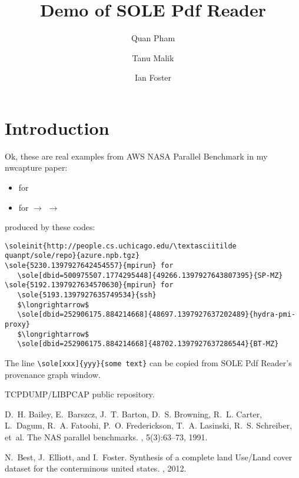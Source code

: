 \documentclass{article}
\title{Demo of SOLE Pdf Reader}
\author{Quan Pham \and Tanu Malik \and Ian Foster}
\begin{document}
\maketitle

\begin{abstract}
\lipsum[1]
\end{abstract}


\section{Introduction}


Ok, these are real examples from AWS NASA Parallel Benchmark in my nwcapture paper:
\begin{itemize}
\item {} for 
\item {} for  $\longrightarrow$  $\longrightarrow$ 
\end{itemize}
produced by these codes:
{\small
\begin{verbatim}
\soleinit{http://people.cs.uchicago.edu/\textasciitilde quanpt/sole/repo}{azure.npb.tgz}
\sole{5230.1397927642454557}{mpirun} for
   \sole[dbid=500975507.1774295448]{49266.1397927643807395}{SP-MZ}
\sole{5192.1397927634570630}{mpirun} for 
   \sole{5193.1397927635749534}{ssh} 
   $\longrightarrow$
   \sole[dbid=252906175.884214668]{48697.1397927637202489}{hydra-pmi-proxy} 
   $\longrightarrow$
   \sole[dbid=252906175.884214668]{48702.1397927637286544}{BT-MZ}
\end{verbatim}
}
The line \verb|\sole[xxx]{yyy}{some text}| can be copied from SOLE Pdf Reader's provenance graph window.

\lipsum[10]


\begin{thebibliography}{10}

{TCPDUMP/LIBPCAP} public repository.

D.~H. Bailey, E.~Barszcz, J.~T. Barton, D.~S. Browning, R.~L. Carter, L.~Dagum,
  R.~A. Fatoohi, P.~O. Frederickson, T.~A. Lasinski, R.~S. Schreiber, et~al.
\newblock The {NAS} parallel benchmarks.
, 5(3):63–73, 1991.

N.~Best, J.~Elliott, and I.~Foster.
\newblock Synthesis of a complete land {Use/Land} cover dataset for the
  conterminous united states.
, 2012.

\end{thebibliography}
\end{document}
